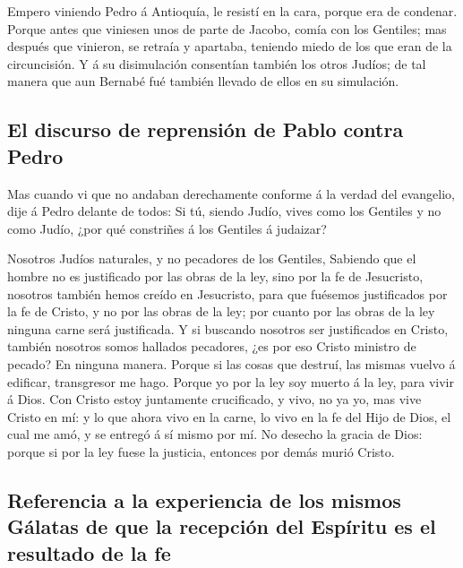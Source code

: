  Empero viniendo Pedro á Antioquía, le resistí en la cara,
porque era de condenar.  Porque antes que viniesen unos de
parte de Jacobo, comía con los Gentiles; mas después que vinieron, se
retraía y apartaba, teniendo miedo de los que eran de la circuncisión.
 Y á su disimulación consentían también los otros Judíos;
de tal manera que aun Bernabé fué también llevado de ellos en su
simulación.

\hypertarget{el-discurso-de-reprensiuxf3n-de-pablo-contra-pedro}{%
\subsection{El discurso de reprensión de Pablo contra
Pedro}\label{el-discurso-de-reprensiuxf3n-de-pablo-contra-pedro}}

 Mas cuando vi que no andaban derechamente conforme á la
verdad del evangelio, dije á Pedro delante de todos: Si tú, siendo
Judío, vives como los Gentiles y no como Judío, ¿por qué constriñes á
los Gentiles á judaizar?

 Nosotros Judíos naturales, y no pecadores de los Gentiles,
 Sabiendo que el hombre no es justificado por las obras de
la ley, sino por la fe de Jesucristo, nosotros también hemos creído en
Jesucristo, para que fuésemos justificados por la fe de Cristo, y no por
las obras de la ley; por cuanto por las obras de la ley ninguna carne
será justificada.  Y si buscando nosotros ser justificados
en Cristo, también nosotros somos hallados pecadores, ¿es por eso Cristo
ministro de pecado? En ninguna manera.  Porque si las cosas
que destruí, las mismas vuelvo á edificar, transgresor me hago.
 Porque yo por la ley soy muerto á la ley, para vivir á
Dios.  Con Cristo estoy juntamente crucificado, y vivo, no
ya yo, mas vive Cristo en mí: y lo que ahora vivo en la carne, lo vivo
en la fe del Hijo de Dios, el cual me amó, y se entregó á sí mismo por
mí.  No desecho la gracia de Dios: porque si por la ley
fuese la justicia, entonces por demás murió Cristo.

\hypertarget{referencia-a-la-experiencia-de-los-mismos-guxe1latas-de-que-la-recepciuxf3n-del-espuxedritu-es-el-resultado-de-la-fe}{%
\subsection{Referencia a la experiencia de los mismos Gálatas de que la
recepción del Espíritu es el resultado de la
fe}\label{referencia-a-la-experiencia-de-los-mismos-guxe1latas-de-que-la-recepciuxf3n-del-espuxedritu-es-el-resultado-de-la-fe}}


